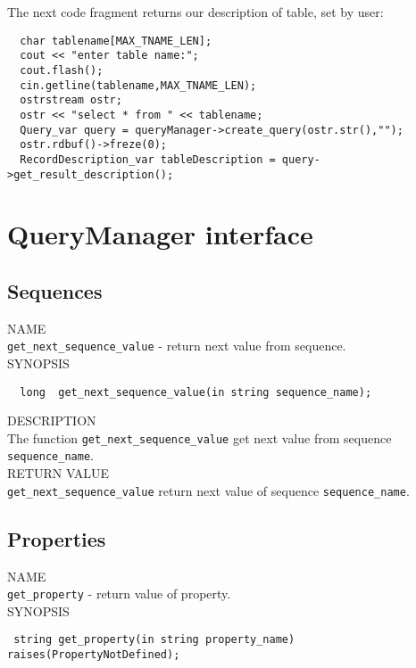 \documentclass[10pt]{article}
\begin{document}
 The next code fragment returns our description of table, set by user:

\begin{verbatim}
  char tablename[MAX_TNAME_LEN];
  cout << "enter table name:";
  cout.flash();
  cin.getline(tablename,MAX_TNAME_LEN); 
  ostrstream ostr;
  ostr << "select * from " << tablename;
  Query_var query = queryManager->create_query(ostr.str(),"");
  ostr.rdbuf()->freze(0);
  RecordDescription_var tableDescription = query->get_result_description(); 
\end{verbatim}


\section{ QueryManager interface }

 
\subsection { Sequences }
 
NAME \\ 
\verb|get_next_sequence_value| - return next value from sequence. \\

\noindent SYNOPSIS 
\begin{verbatim}
  long  get_next_sequence_value(in string sequence_name); 
\end{verbatim}
  
\noindent DESCRIPTION \\
The function \verb|get_next_sequence_value| get next value from  sequence \verb|sequence_name|. \\


\noindent RETURN VALUE \\
\verb|get_next_sequence_value| return next value of sequence \verb|sequence_name|. 
  
\subsection { Properties }
  
NAME \\
\verb|get_property| - return value of property. \\ 
  
\noindent SYNOPSIS 
\begin{verbatim}
 string get_property(in string property_name)   raises(PropertyNotDefined); 
\end{verbatim}
   
\end{document}

